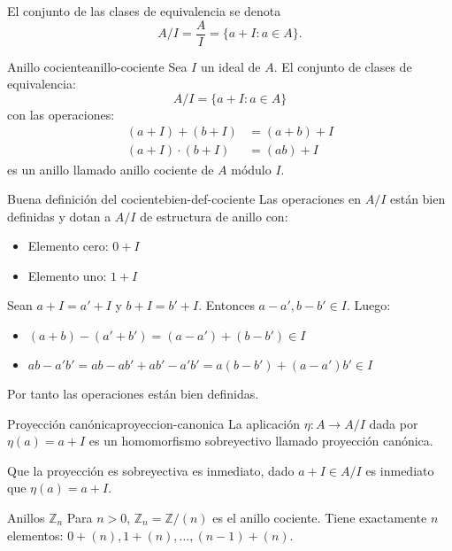 El conjunto de las clases de equivalencia se denota
\[
A/I = \frac{A}{I} = \{a + I : a \in A\}.
\]

\begin{definition}{Anillo cociente}{anillo-cociente}
    Sea \(I\) un ideal de \(A\). El conjunto de clases de equivalencia:
    \[
    A/I = \{a + I : a \in A\}
    \]
    con las operaciones:
    \begin{align*}
        (a + I) + (b + I) &= (a + b) + I \\
        (a + I) \cdot (b + I) &= (ab) + I
    \end{align*}
    es un anillo llamado {anillo cociente de \(A\) módulo \(I\)}.
\end{definition}

\begin{proposition}{Buena definición del cociente}{bien-def-cociente}
    Las operaciones en \(A/I\) están bien definidas y dotan a \(A/I\) de estructura de anillo con:
    \begin{itemize}
        \item Elemento cero: \(0 + I\)
        \item Elemento uno: \(1 + I\)
    \end{itemize}
\end{proposition}

\begin{proofbox}
    Sean \(a + I = a' + I\) y \(b + I = b' + I\). Entonces \(a - a', b - b' \in I\). Luego:
    \begin{itemize}
        \item \((a + b) - (a' + b') = (a - a') + (b - b') \in I\)
        \item \(ab - a'b' = ab - ab' + ab' - a'b' = a(b - b') + (a - a')b' \in I\)
    \end{itemize}
    Por tanto las operaciones están bien definidas.
\end{proofbox}

\begin{definition}{Proyección canónica}{proyeccion-canonica}
    La aplicación \(\eta: A \to A/I\) dada por \(\eta(a) = a + I\) es un homomorfismo sobreyectivo llamado {proyección canónica}.
\end{definition}

\begin{proofbox}
    Que la proyección es sobreyectiva es inmediato, dado $a + I \in A/I$ es inmediato que $\eta(a) = a + I$.
\end{proofbox}

\begin{example}{Anillos \(\mathbb{Z}_n\)}{}
    Para \(n > 0\), \(\mathbb{Z}_n = \mathbb{Z}/(n)\) es el anillo cociente. Tiene exactamente \(n\) elementos: \(0 + (n), 1 + (n), \ldots, (n-1) + (n)\).
\end{example}

